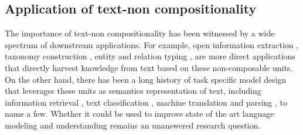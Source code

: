 \subsection{Application of text-non compositionality}
The importance of text-non compositionality has been witnessed by a wide spectrum of downstream applications. 
For example, open information extraction \cite{banko2007open}, taxonomy construction \cite{wu2012probase, carlson2010toward}, entity and relation typing \cite{ren2016automatic, facetgist}, are more direct applications that directly harvest knowledge from text based on these non-composable units.
On the other hand, there has been a long history of task specific model design that leverages these units as semantics representation of text, including 
information retrieval \cite{xiong2015query, dalton2014entity, shen2018entity}, text classification \cite{furnkranz1998study}, machine translation \cite{koehn2003statistical} and parsing \cite{cafferkey2007multi, savary2015parseme}, to name a few. Whether it could be used to improve state of the art language modeling and understanding remains an unanswered research question.
